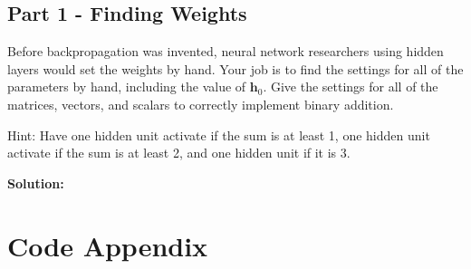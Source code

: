 \documentclass[11pt, oneside]{article}   	%
\begin{document}
\subsection*{Part 1 - Finding Weights }

Before backpropagation was invented, neural network researchers using hidden layers would set the weights by hand. Your job is to find the settings for all of the parameters by hand, including the value of $\mathbf{h}_0$. Give the settings for all of the matrices, vectors, and scalars to correctly implement binary addition.

Hint: Have one hidden unit activate if the sum is at least 1, one hidden unit activate if the sum is at least 2, and one hidden unit if it is 3.


\textbf{Solution:} \\



\section*{Code Appendix}
\end{document}
